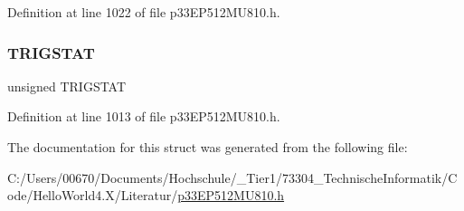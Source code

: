 Definition at line 1022 of file p33\+E\+P512\+M\+U810.\+h.

\mbox{\label{structtag_i_c9_c_o_n2_b_i_t_s_ab379549de54ac93ad4aa73686c34cb7c}} 
\subsubsection{\texorpdfstring{T\+R\+I\+G\+S\+T\+AT}{TRIGSTAT}}
{\footnotesize\ttfamily unsigned T\+R\+I\+G\+S\+T\+AT}



Definition at line 1013 of file p33\+E\+P512\+M\+U810.\+h.



The documentation for this struct was generated from the following file\+:\begin{DoxyCompactItemize}
\item 
C\+:/\+Users/00670/\+Documents/\+Hochschule/\+\_\+\+Tier1/73304\+\_\+\+Technische\+Informatik/\+Code/\+Hello\+World4.\+X/\+Literatur/\hyperlink{p33_e_p512_m_u810_8h}{p33\+E\+P512\+M\+U810.\+h}\end{DoxyCompactItemize}

